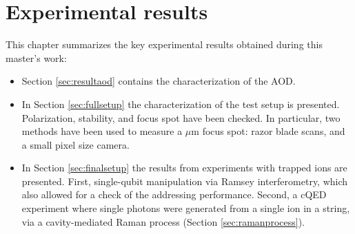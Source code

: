 
\chapter{Experimental results}
\label{ch:results}
This chapter summarizes the key experimental results obtained during this master's work:
\begin{itemize}
\item Section \ref{sec:resultaod} contains the characterization of the AOD.
\item In Section \ref{sec:fullsetup} the characterization of the test setup is presented. Polarization, stability, and focus spot have been checked. In particular, two methods have been used to measure a $\mu$m focus spot: razor blade scans, and a small pixel size camera.
\item In Section \ref{sec:finalsetup} the results from experiments with trapped ions are presented. First, single-qubit manipulation via Ramsey interferometry, which also allowed for a check of the addressing performance. Second, a cQED experiment where single photons were generated from a single ion in a string, via a cavity-mediated Raman process (Section \ref{sec:ramanprocess}).
\end{itemize}
